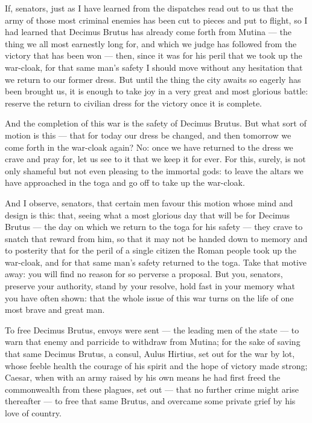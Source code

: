 
 If, senators, just as I have learned from the dispatches read out to us that the army of those most criminal enemies has been cut to pieces and put to flight, so I had learned that Decimus Brutus has already come forth from Mutina --- the thing we all most earnestly long for, and which we judge has followed from the victory that has been won --- then, since it was for his peril that we took up the war-cloak, for that same man's safety I should move without any hesitation that we return to our former dress. But until the thing the city awaits so eagerly has been brought us, it is enough to take joy in a very great and most glorious battle: reserve the return to civilian dress for the victory once it is complete.

 And the completion of this war is the safety of Decimus Brutus. But what sort of motion is this --- that for today our dress be changed, and then tomorrow we come forth in the war-cloak again? No: once we have returned to the dress we crave and pray for, let us see to it that we keep it for ever. For this, surely, is not only shameful but not even pleasing to the immortal gods: to leave the altars we have approached in the toga and go off to take up the war-cloak.

 And I observe, senators, that certain men favour this motion whose mind and design is this: that, seeing what a most glorious day that will be for Decimus Brutus --- the day on which we return to the toga for his safety --- they crave to snatch that reward from him, so that it may not be handed down to memory and to posterity that for the peril of a single citizen the Roman people took up the war-cloak, and for that same man's safety returned to the toga. Take that motive away: you will find no reason for so perverse a proposal. But you, senators, preserve your authority, stand by your resolve, hold fast in your memory what you have often shown: that the whole issue of this war turns on the life of one most brave and great man.

 To free Decimus Brutus, envoys were sent --- the leading men of the state --- to warn that enemy and parricide to withdraw from Mutina; for the sake of saving that same Decimus Brutus, a consul, Aulus Hirtius, set out for the war by lot, whose feeble health the courage of his spirit and the hope of victory made strong; Caesar, when with an army raised by his own means he had first freed the commonwealth from these plagues, set out --- that no further crime might arise thereafter --- to free that same Brutus, and overcame some private grief by his love of country.

